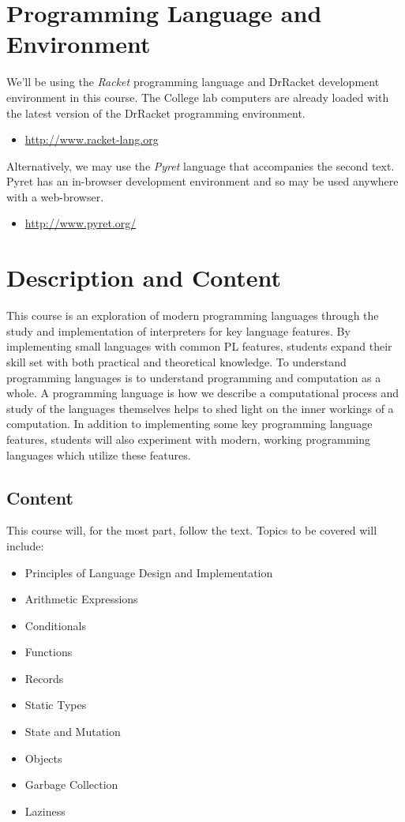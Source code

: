 \documentclass[10pt]{article}
\begin{document}
\section{Programming Language and Environment}

We'll be using the \textit{Racket} programming language and DrRacket development environment in this course. The College lab computers are already loaded with the latest version of the DrRacket programming environment.    
\begin{itemize}
\item \url{http://www.racket-lang.org}
\end{itemize}

\noindent
Alternatively, we may use the \textit{Pyret} language that accompanies the second text. Pyret has an in-browser development environment and so may be used anywhere with a web-browser.
\begin{itemize}
\item \url{http://www.pyret.org/}
\end{itemize}

\section{Description and Content}
This course is an exploration of modern programming languages through the study and implementation of  interpreters for key language features.  By implementing small languages with common PL features, students expand their skill set with both practical and theoretical knowledge.  To understand programming languages is to understand programming and computation as a whole.  A programming language is how we describe a computational process and study of the languages themselves helps to shed light on the inner workings of a computation.
In addition to implementing some key programming language features, students will also experiment with modern, working programming languages which utilize these features.   

\subsection{Content}

This course will, for the most part, follow the text.  Topics to be covered will include:
\begin{itemize}
\item Principles of Language Design and Implementation 
\item Arithmetic Expressions
\item Conditionals
\item Functions
\item Records
\item Static Types
\item State and Mutation
\item Objects
\item Garbage Collection
\item Laziness
\end{itemize}
\end{document}
